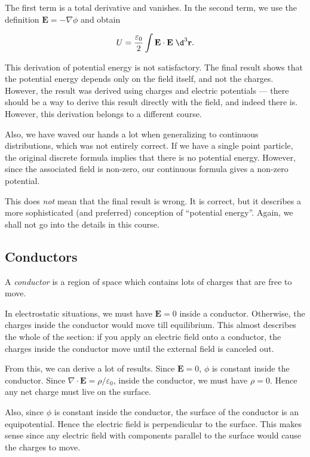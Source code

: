 \documentclass[a4paper]{article}
\begin{document}
The first term is a total derivative and vanishes. In the second term, we use the definition $\mathbf{E} = -\nabla \phi$ and obtain
\begin{prop}
  \[
    U = \frac{\varepsilon_0}{2}\int \mathbf{E}\cdot \mathbf{E} \;\d^3 \mathbf{r}.
  \]
\end{prop}
This derivation of potential energy is not satisfactory. The final result shows that the potential energy depends only on the field itself, and not the charges. However, the result was derived using charges and electric potentials --- there should be a way to derive this result directly with the field, and indeed there is. However, this derivation belongs to a different course.

Also, we have waved our hands a lot when generalizing to continuous distributions, which was not entirely correct. If we have a single point particle, the original discrete formula implies that there is no potential energy. However, since the associated field is non-zero, our continuous formula gives a non-zero potential.

This does \emph{not} mean that the final result is wrong. It is correct, but it describes a more sophisticated (and preferred) conception of ``potential energy''. Again, we shall not go into the details in this course.

\subsection{Conductors}
\begin{defi}[Conductor]
  A \emph{conductor} is a region of space which contains lots of charges that are free to move.
\end{defi}

In electrostatic situations, we must have $\mathbf{E} = 0$ inside a conductor. Otherwise, the charges inside the conductor would move till equilibrium. This almost describes the whole of the section: if you apply an electric field onto a conductor, the charges inside the conductor move until the external field is canceled out.

From this, we can derive a lot of results. Since $\mathbf{E} = 0$, $\phi$ is constant inside the conductor. Since $\nabla \cdot \mathbf{E} = \rho/\varepsilon_0$, inside the conductor, we must have $\rho = 0$. Hence any net charge must live on the surface.

Also, since $\phi$ is constant inside the conductor, the surface of the conductor is an equipotential. Hence the electric field is perpendicular to the surface. This makes sense since any electric field with components parallel to the surface would cause the charges to move.
\end{document}
